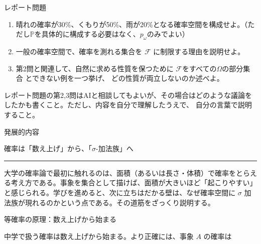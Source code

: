 \documentclass[a4paper,10pt,pdflatex,ja=standard,jafont=ipaex-type1,
  magstyle=real,scale=1]{bxjsarticle}
\newcommand{\topic}[1]{\par\vspace{5pt}
  {\large\sffamily\mdseries\color{accent}#1}\par\vspace{2pt}}
\newcommand{\keybox}[1]{\par\vspace{3pt}\begingroup
  \setlength{\fboxsep}{5pt}
  \colorbox{soft}{\parbox{\dimexpr\linewidth-2\fboxsep\relax}{#1}}%
  \endgroup\par\vspace{2pt}}
\newcommand{\F}{\mathcal F}
\begin{document}
\topic{レポート問題}
\begin{enumerate}[label=\arabic*.]
  \item 晴れの確率が30\%、くもりが50\%、雨が20\%となる確率空間を構成せよ。（ただし$\mathbb P$を具体的に構成する必要はなく、$p_{\omega}$のみでよい）
  \item 一般の確率空間で、確率を測れる集合を $\F$ に制限する理由を説明せよ。
  \item 第2問と関連して、自然に求める性質を保つために $\F$をすべての$\Omega$の部分集合 とできない例を一つ挙げ、
  どの性質が両立しないのか述べよ。
\end{enumerate}
\keybox{レポート問題の第2,3問はAIと相談してもよいが、その場合はどのような議論をしたかも書くこと。ただし、内容を自分で理解したうえで、
自分の言葉で説明すること。}

\newpage
\begingroup
\fontsize{10pt}{13.5pt}\selectfont
\setlength{\parskip}{2.5pt}
\setlength{\abovedisplayskip}{4pt}
\setlength{\belowdisplayskip}{4pt}
\newcommand{\columnheading}[1]{\par\vspace{5pt}
  {\fontsize{11pt}{15pt}\selectfont\sffamily\mdseries\color{accent}#1}\par\vspace{2pt}}
\newcommand{\columncontinuation}{%
  {\small\sffamily\mdseries\color{accent}コラム（続き）}\par
  \vspace{3pt}
  {\color{accent}\rule{\linewidth}{0.7pt}}\par\vspace{3pt}}

{\small\sffamily\mdseries\color{accent}発展的内容\quad }\par
\vspace{4pt}
{\Large\color{ink}確率は「数え上げ」から、「$\sigma$-加法族」へ}\par

\vspace{2pt}
{\color{accent}\rule{\linewidth}{0.7pt}}\par
\vspace{4pt}

大学の確率論で最初に触れるのは、面積（あるいは長さ・体積）で確率をとらえる考え方である。事象を集合として描けば、面積が大きいほど「起こりやすい」と感じられる。学びを進めると、次に立ちはだかる壁は、なぜ確率空間に $\sigma$ 加法族が現れるのかという点である。その道筋をざっくり説明する。\par

\columnheading{等確率の原理：数え上げから始まる}
中学で扱う確率は数え上げから始まる。より正確には、事象 $A$ の確率は\par
\end{document}
